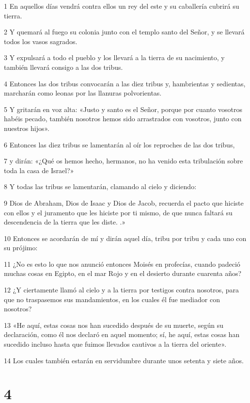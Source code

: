 \par 1 En aquellos días vendrá contra ellos un rey del este y su caballería cubrirá su tierra.
\par 2 Y quemará al fuego su colonia junto con el templo santo del Señor, y se llevará todos los vasos sagrados.
\par 3 Y expulsará a todo el pueblo y los llevará a la tierra de su nacimiento, y también llevará consigo a las dos tribus.
\par 4 Entonces las dos tribus convocarán a las diez tribus y, hambrientas y sedientas, marcharán como leonas por las llanuras polvorientas.
\par 5 Y gritarán en voz alta: «Justo y santo es el Señor, porque por cuanto vosotros habéis pecado, también nosotros hemos sido arrastrados con vosotros, junto con nuestros hijos».
\par 6 Entonces las diez tribus se lamentarán al oír los reproches de las dos tribus,
\par 7 y dirán: «¿Qué os hemos hecho, hermanos, no ha venido esta tribulación sobre toda la casa de Israel?»
\par 8 Y todas las tribus se lamentarán, clamando al cielo y diciendo:
\par 9 Dios de Abraham, Dios de Isaac y Dios de Jacob, recuerda el pacto que hiciste con ellos y el juramento que les hiciste por ti mismo, de que nunca faltará su descendencia de la tierra que les diste. .»
\par 10 Entonces se acordarán de mí y dirán aquel día, tribu por tribu y cada uno con su prójimo:
\par 11 ¿No es esto lo que nos anunció entonces Moisés en profecías, cuando padeció muchas cosas en Egipto, en el mar Rojo y en el desierto durante cuarenta años?
\par 12 ¿Y ciertamente llamó al cielo y a la tierra por testigos contra nosotros, para que no traspasemos sus mandamientos, en los cuales él fue mediador con nosotros?
\par 13 «He aquí, estas cosas nos han sucedido después de su muerte, según su declaración, como él nos declaró en aquel momento; sí, he aquí, estas cosas han sucedido incluso hasta que fuimos llevados cautivos a la tierra del oriente».
\par 14 Los cuales también estarán en servidumbre durante unos setenta y siete años.

\chapter{4}

